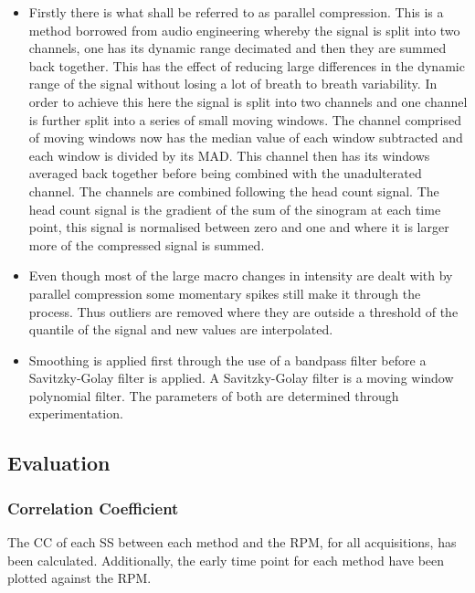                     \begin{itemize}
                        \item Firstly there is what shall be referred to as parallel compression. This is a method borrowed from audio engineering whereby the signal is split into two channels, one has its dynamic range decimated and then they are summed back together. This has the effect of reducing large differences in the dynamic range of the signal without losing a lot of breath to breath variability. In order to achieve this here the signal is split into two channels and one channel is further split into a series of small moving windows. The channel comprised of moving windows now has the median value of each window subtracted and each window is divided by its \gls{MAD}. This channel then has its windows averaged back together before being combined with the unadulterated channel. The channels are combined following the head count signal. The head count signal is the gradient of the sum of the sinogram at each time point, this signal is normalised between zero and one and where it is larger more of the compressed signal is summed.
                        
                        \item Even though most of the large macro changes in intensity are dealt with by parallel compression some momentary spikes still make it through the process. Thus outliers are removed where they are outside a threshold of the quantile of the signal and new values are interpolated.
                        
                        \item Smoothing is applied first through the use of a bandpass filter before a Savitzky-Golay filter is applied. A Savitzky-Golay filter is a moving window polynomial filter. The parameters of both are determined through experimentation.
                    \end{itemize}
            
            \subsection{Evaluation} \label{sec:pca_data_driven_surrogate_signal_extraction_methods_for_dynamic_pet_methods_evaluation}
                \subsubsection{Correlation Coefficient} \label{sec:pca_data_driven_surrogate_signal_extraction_methods_for_dynamic_pet_methods_cross_correlation}
                    The \gls{CC} of each \gls{SS} between each method and the \gls{RPM}, for all acquisitions, has been calculated. Additionally, the early time point  for each method have been plotted against the \gls{RPM}.
            
